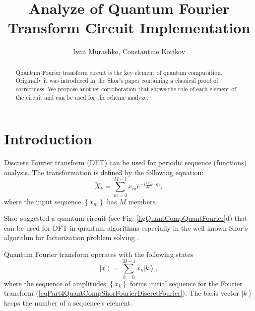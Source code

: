 \documentclass{llncs}
\begin{document}
\title{Analyze of Quantum Fourier Transform Circuit Implementation}
\author{Ivan Murashko, Constantine Korikov}
\maketitle

\begin{abstract}
  Quantum Fourier transform circuit is the key element of quantum computation.
  Originally it was introduced in the Shor's paper containing a classical
  proof of correctness. We propose another corroboration that shows
  the role of each element of the circuit and can be used for the scheme analyze.
\end{abstract}

\section{Introduction}
Discrete Fourier transform (DFT) can be used for periodic sequence
(functions) analysis. The transformation is defined by the following
equation: 
\begin{equation}
\tilde{X}_k = \sum^{M - 1}_{m = 0} x_m e^{-i \frac{2 \pi}{M} k\cdot m},
\label{eqPart4QuantCompShorFourierDiscretFourier}
\end{equation}
where the input sequence $\left\{x_m\right\}$ has $M$
members.

Shor \cite{shor} suggested a quantum circuit
(see Fig. \ref{figQuantCompQuantFourier}d) 
that can be used for DFT
in quantum algorithms \cite{shor,kitaev,lanyon,ettinger} especially in the
well known Shor's algorithm for factorization problem solving
\cite{shor}.  

Quantum Fourier transform \cite{shor} operates with the following states
\begin{equation}
\left|x\right> = \sum_{k = 0}^{M - 1}x_k \left|k\right>,
\label{eqPart4QuantCompShorQuantFourierSeries}
\end{equation}
where the sequence of amplitudes $\left\{x_k\right\}$ forms initial
sequence for the Fourier transform
(\ref{eqPart4QuantCompShorFourierDiscretFourier}). 
The basis vector $\left|k\right>$ keeps the number of a sequence's element.   
\end{document}
